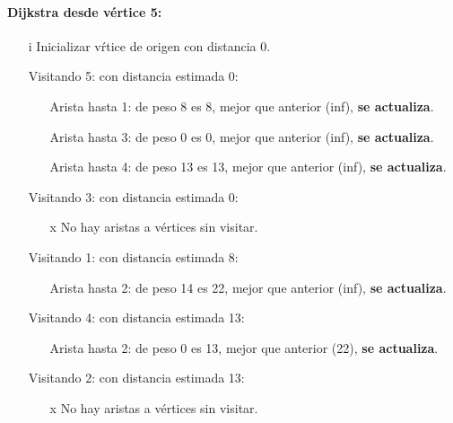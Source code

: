 \documentclass[../tp2_grupo404.tex]{subfiles}
\begin{document}
\paragraph{Dijkstra desde v\'ertice 5:}\par
\begin{enumerate}
\item[i] Inicializar v\'rtice de origen con distancia 0.
 \item[Visitando 5:] con distancia estimada 0:
\begin{enumerate}
   \item[Arista hasta 1:] de peso 8 es 8, mejor que anterior (inf), \textbf{se actualiza}.
   \item[Arista hasta 3:] de peso 0 es 0, mejor que anterior (inf), \textbf{se actualiza}.
   \item[Arista hasta 4:] de peso 13 es 13, mejor que anterior (inf), \textbf{se actualiza}.
\end{enumerate}

 \item[Visitando 3:] con distancia estimada 0:
\begin{enumerate}
   \item[x] No hay aristas a v\'ertices sin visitar.
\end{enumerate}

 \item[Visitando 1:] con distancia estimada 8:
\begin{enumerate}
   \item[Arista hasta 2:] de peso 14 es 22, mejor que anterior (inf), \textbf{se actualiza}.
\end{enumerate}

 \item[Visitando 4:] con distancia estimada 13:
\begin{enumerate}
   \item[Arista hasta 2:] de peso 0 es 13, mejor que anterior (22), \textbf{se actualiza}.
\end{enumerate}

 \item[Visitando 2:] con distancia estimada 13:
\begin{enumerate}
   \item[x] No hay aristas a v\'ertices sin visitar.
\end{enumerate}

\end{enumerate}
\end{document}
